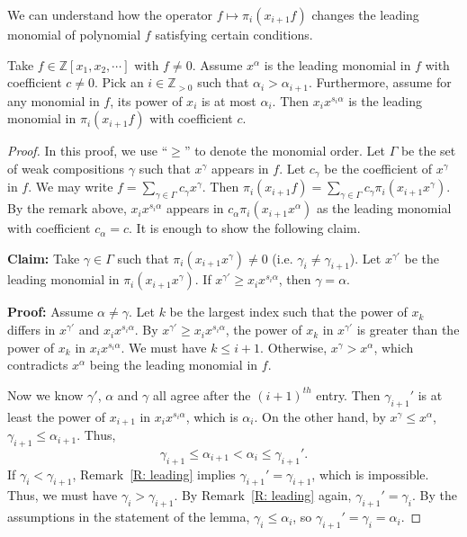\documentclass[ALCO]{cedram}
\newcommand{\Z}{\mathbb{Z}}
\begin{document}
We can understand how the operator
$f \mapsto \pi_i(x_{i+1} f)$ changes 
the leading monomial of polynomial $f$
satisfying certain conditions. 

\begin{lemma}
\label{L: monomials from operator}
Take $f \in \Z[x_1, x_2, \cdots ]$ with $f \neq 0$.
Assume $x^\alpha$ is the leading monomial in $f$ 
with coefficient $c \neq 0$.
Pick an $i\in \Z_{>0}$ such that $\alpha_{i} > \alpha_{i+1}$.
Furthermore, assume for any monomial in $f$, 
its power of $x_{i}$ is at most $\alpha_{i}$.
Then $x_ix^{s_i \alpha}$ is the leading monomial in
$\pi_{i}(x_{i+1}f)$ with coefficient $c$. 
\end{lemma}
\begin{proof}
In this proof, we use ``$\geq$'' to denote the 
monomial order.
Let $\Gamma$ be the set of weak compositions $\gamma$
such that $x^\gamma$ appears in $f$.
Let $c_\gamma$ be the coefficient of $x^\gamma$ in $f$.
We may write $f = \sum_{\gamma \in \Gamma} c_\gamma x^\gamma$.
Then 
$\pi_{i}(x_{i+1}f) = \sum_{\gamma \in \Gamma} c_\gamma \pi_{i}(x_{i+1}x^\gamma)$.
By the remark above, $x_ix^{s_i \alpha}$ appears 
in $c_\alpha\pi_i(x_{i+1}x^\alpha)$ as the leading monomial
with coefficient $c_\alpha = c$.
It is enough to show the following claim.

\noindent\textbf{Claim:} 
Take $\gamma \in \Gamma$ such that 
$\pi_i(x_{i+1}x^{\gamma}) \neq 0$ 
(i.e. $\gamma_i \neq \gamma_{i+1}$). 
Let $x^{\gamma'}$ be the leading monomial 
in $\pi_i(x_{i+1}x^{\gamma})$.
If $x^{\gamma'}  \geq x_ix^{s_i \alpha}$,
then $\gamma = \alpha$.

\noindent\textbf{Proof:} 
Assume $\alpha \neq \gamma$.
Let $k$ be the largest index such that 
the power of $x_k$ differs in $x^{\gamma'}$ and $x_ix^{s_i \alpha}$.
By $x^{\gamma'}  \geq x_ix^{s_i \alpha}$,
the power of $x_k$ in $x^{\gamma'}$ is greater than
the power of $x_k$ in $x_ix^{s_i \alpha}$.
We must have $k \leqslant i+1$.
Otherwise,
$x^\gamma > x^\alpha$,
which contradicts $x^\alpha$ being the leading monomial in $f$.

Now we know 
$\gamma'$, $\alpha$ and $\gamma$ all agree after 
the $(i+1)^{th}$ entry.
Then
$\gamma_{i+1}'$ is at least
the power of $x_{i+1}$ in $x_ix^{s_i \alpha}$,
which is $\alpha_i$.
On the other hand, by $x^\gamma \leqslant x^\alpha$,
$\gamma_{i+1} \leqslant \alpha_{i+1}$.
Thus, 
\begin{equation}
\label{EQ: chain inequality}
\gamma_{i+1} \leq  \alpha_{i+1}<\alpha_i \leq \gamma_{i+1}'.
\end{equation}
If $\gamma_{i} < \gamma_{i+1}$,
Remark~\ref{R: leading} implies $\gamma_{i+1}'= \gamma_{i+1}$,
which is impossible.
Thus, we must have $\gamma_i > \gamma_{i+1}$. 
By Remark~\ref{R: leading} again, $\gamma_{i+1}' = \gamma_i$.
By the assumptions in the statement of the lemma, $\gamma_i \leqslant \alpha_i$,
so $\gamma_{i+1}' = \gamma_i = \alpha_i$.


\end{proof}
\end{document}
